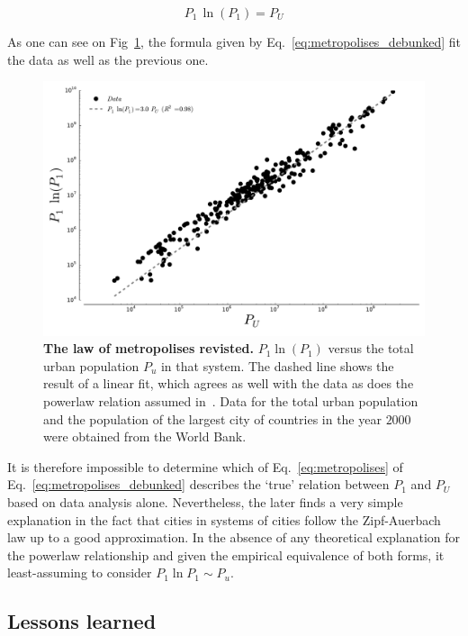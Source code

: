 \begin{equation}
    \boxed{P_1\,\ln(P_1) = P_U}
    \label{eq:metropolises_debunked}
\end{equation}

As one can see on Fig~\ref{fig:metropolises_debunked}, the formula given by
Eq.~\ref{eq:metropolises_debunked} fit the data as well as the previous one.

\begin{figure}[!h]
    \centering
    \includegraphics[width=\textwidth]{gfx/chapter-intro/law_metropolises_debunked.pdf}
    \caption{{\bf The law of metropolises revisted.} $P_1 \ln(P_1)$ versus the total urban population $P_u$ in that
system. The dashed line shows the result of a linear fit, which agrees as well
with the data as does the powerlaw relation assumed in~\cite{Pumain:1997}. Data for the total urban
population and the population of the largest city of countries in the year
$2000$ were obtained from
the World Bank.\label{fig:metropolises_debunked}}
\end{figure}


It is therefore impossible to determine which of
Eq.~\ref{eq:metropolises} of Eq.~\ref{eq:metropolises_debunked} describes the
`true' relation between $P_1$ and $P_U$ based on data analysis alone.
Nevertheless, the later finds a very simple explanation in the fact that cities
in systems of cities follow the Zipf-Auerbach law up to a good
approximation. In the absence of any theoretical explanation for the powerlaw
relationship and given the empirical equivalence of both forms, it
least-assuming to consider $P_1 \ln P_1 \sim P_u$.


\subsection{Lessons learned}
\label{sub:lessons_learned}

